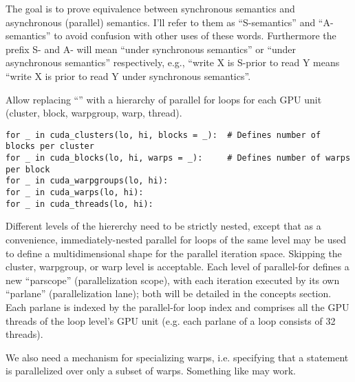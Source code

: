 \filbreak
The goal is to prove equivalence between synchronous semantics and asynchronous (parallel) semantics.
I'll refer to them as ``S-semantics'' and ``A-semantics'' to avoid confusion with other uses of these words.
Furthermore the prefix S- and A- will mean ``under synchronous semantics'' or ``under asynchronous semantics'' respectively, e.g., ``write X is S-prior to read Y means ``write X is prior to read Y under synchronous semantics''.


\filbreak
{}

 Allow replacing ``'' with a hierarchy of parallel for loops for each GPU unit (cluster, block, warpgroup, warp, thread).

\filbreak
{\color{lightttColor}
\begin{verbatim}
for _ in cuda_clusters(lo, hi, blocks = _):  # Defines number of blocks per cluster
for _ in cuda_blocks(lo, hi, warps = _):     # Defines number of warps per block
for _ in cuda_warpgroups(lo, hi):
for _ in cuda_warps(lo, hi):
for _ in cuda_threads(lo, hi):
\end{verbatim}
}

\filbreak
Different levels of the hiererchy need to be strictly nested, except that as a convenience, immediately-nested parallel for loops of the same level may be used to define a multidimensional shape for the parallel iteration space.
Skipping the cluster, warpgroup, or warp level is acceptable.
Each level of parallel-for defines a new ``parscope'' (parallelization scope), with each iteration executed by its own ``parlane'' (parallelization lane); both will be detailed in the concepts section.
Each parlane is indexed by the parallel-for loop index and comprises all the GPU threads of the loop level's GPU unit (e.g. each parlane of a  loop consists of 32 threads).

\filbreak
We also need a mechanism for specializing warps, i.e. specifying that a  statement is parallelized over only a subset of warps.
Something like  may work.

